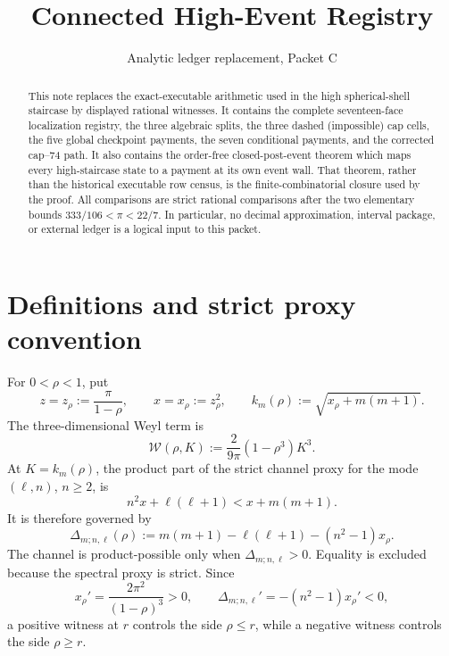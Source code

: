 \documentclass[11pt]{article}
\title{Connected High-Event Registry}
\author{}
\date{Analytic ledger replacement, Packet C}
\newcommand{\W}{\mathcal W}
\newcommand{\Dlt}{\Delta}
\begin{document}
\maketitle

\begin{abstract}
This note replaces the exact-executable arithmetic used in the high
spherical-shell staircase by displayed rational witnesses.  It contains
the complete seventeen-face localization registry, the three algebraic
splits, the three dashed (impossible) cap cells, the five global checkpoint
payments, the seven conditional payments, and the corrected cap--74 path.
It also contains the order-free closed-post-event theorem which maps every
high-staircase state to a payment at its own event wall.  That theorem,
rather than the historical executable row census, is the finite-combinatorial
closure used by the proof.
All comparisons are strict rational comparisons after the two elementary
bounds \(333/106<\pi<22/7\).  In particular, no decimal approximation,
interval package, or external ledger is a logical input to this packet.
\end{abstract}

\section{Definitions and strict proxy convention}

For \(0<\rho<1\), put
\begin{equation}
 z=z_\rho:=\frac{\pi}{1-\rho},\qquad
 x=x_\rho:=z_\rho^2,\qquad
 k_m(\rho):=\sqrt{x_\rho+m(m+1)}.
 \label{eq:def-z-k}
\end{equation}
The three-dimensional Weyl term is
\begin{equation}
 \W(\rho,K):=\frac{2}{9\pi}(1-\rho^3)K^3.
 \label{eq:def-W}
\end{equation}
At \(K=k_m(\rho)\), the product part of the strict channel proxy for the
mode \((\ell,n)\), \(n\geq2\), is
\[
 n^2x+\ell(\ell+1)<x+m(m+1).
\]
It is therefore governed by
\begin{equation}
 \Dlt_{m;n,\ell}(\rho)
 :=m(m+1)-\ell(\ell+1)-(n^2-1)x_\rho.
 \label{eq:delta}
\end{equation}
The channel is product-possible only when \(\Dlt_{m;n,\ell}>0\).
Equality is excluded because the spectral proxy is strict.  Since
\begin{equation}
 x_\rho'=\frac{2\pi^2}{(1-\rho)^3}>0,
 \qquad
 \Dlt_{m;n,\ell}'=-(n^2-1)x_\rho'<0,
 \label{eq:delta-monotone}
\end{equation}
a positive witness at \(r\) controls the side \(\rho\leq r\), while a
negative witness controls the side \(\rho\geq r\).
\end{document}
